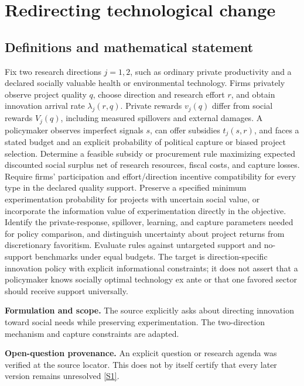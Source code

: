 \documentclass[11pt]{article}
\newcommand{\sref}[2]{\hyperlink{source:#1:#2}{[S#2]}}
\begin{document}
\section*{Redirecting technological change}\label{30007551}
\subsection{Definitions and mathematical statement}
Fix two research directions \(j=1,2\), such as ordinary private productivity and a declared socially valuable health or environmental technology. Firms privately observe project quality \(q\), choose direction and research effort \(r\), and obtain innovation arrival rate \(\lambda_j(r,q)\). Private rewards \(v_j(q)\) differ from social rewards \(V_j(q)\), including measured spillovers and external damages. A policymaker observes imperfect signals \(s\), can offer subsidies \(t_j(s,r)\), and faces a stated budget and an explicit probability of political capture or biased project selection.
Determine a feasible subsidy or procurement rule maximizing expected discounted social surplus net of research resources, fiscal costs, and capture losses. Require firms’ participation and effort/direction incentive compatibility for every type in the declared quality support. Preserve a specified minimum experimentation probability for projects with uncertain social value, or incorporate the information value of experimentation directly in the objective.
Identify the private-response, spillover, learning, and capture parameters needed for policy comparison, and distinguish uncertainty about project returns from discretionary favoritism. Evaluate rules against untargeted support and no-support benchmarks under equal budgets. The target is direction-specific innovation policy with explicit informational constraints; it does not assert that a policymaker knows socially optimal technology ex ante or that one favored sector should receive support universally.

\par\textbf{Formulation and scope.} The source explicitly asks about directing innovation toward social needs while preserving experimentation. The two-direction mechanism and capture constraints are adapted.

\par\textbf{Open-question provenance.} An explicit question or research agenda was verified at the source locator. This does not by itself certify that every later version remains unresolved \sref{30007551}{1}.
\end{document}
